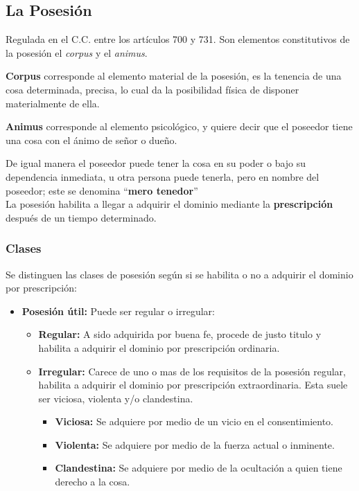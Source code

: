 \documentclass{templateNote}
\begin{document}
\subsection{La Posesión}
\noindent Regulada en el C.C. entre los artículos 700 y 731. Son elementos constitutivos de la posesión el \textit{corpus} y el \textit{animus}.

\textbf{Corpus} corresponde al elemento material de la posesión, es la tenencia de una cosa determinada, precisa, lo cual da la posibilidad física de disponer materialmente de ella.

\textbf{Animus} corresponde al elemento psicológico, y quiere decir que el poseedor tiene una cosa con el ánimo de señor o dueño.

De igual manera el poseedor puede tener la cosa en su poder o bajo su dependencia inmediata, u otra persona puede tenerla, pero en nombre del poseedor; este se denomina “\textbf{mero tenedor}”
\\
La posesión habilita a llegar a adquirir el dominio mediante la \textbf{prescripción} después de un tiempo determinado.

\subsubsection{Clases}
Se distinguen las clases de posesión según si se habilita o no a adquirir el dominio por prescripción:
\begin{itemize}
    \item \textbf{Posesión útil:} Puede ser regular o irregular:
    \begin{itemize}
        \item \textbf{Regular:} A sido adquirida por buena fe, procede de justo titulo y habilita a adquirir el dominio por prescripción ordinaria.
        \item \textbf{Irregular:} Carece de uno o mas de los requisitos de la posesión regular, habilita a adquirir el dominio por prescripción extraordinaria. Esta suele ser viciosa, violenta y/o clandestina.
        \begin{itemize}
            \item \textbf{Viciosa:} Se adquiere por medio de un vicio en el consentimiento.
            \item \textbf{Violenta:} Se adquiere por medio de la fuerza actual o inminente.
            \item \textbf{Clandestina:} Se adquiere por medio de la ocultación a quien tiene derecho a la cosa.
        \end{itemize}
    \end{itemize}
\end{itemize}
\end{document}
